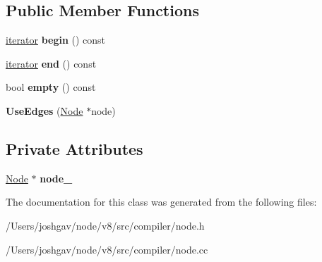 \subsection*{Public Member Functions}
\begin{DoxyCompactItemize}
\item 
\hyperlink{classv8_1_1internal_1_1compiler_1_1_node_1_1_use_edges_1_1iterator}{iterator} {\bfseries begin} () const \hypertarget{classv8_1_1internal_1_1compiler_1_1_node_1_1_use_edges_a84eaf8559ba0920a9608565ce1c51fbf}{}\label{classv8_1_1internal_1_1compiler_1_1_node_1_1_use_edges_a84eaf8559ba0920a9608565ce1c51fbf}

\item 
\hyperlink{classv8_1_1internal_1_1compiler_1_1_node_1_1_use_edges_1_1iterator}{iterator} {\bfseries end} () const \hypertarget{classv8_1_1internal_1_1compiler_1_1_node_1_1_use_edges_a632083fcc45db4788c950d20a27646e0}{}\label{classv8_1_1internal_1_1compiler_1_1_node_1_1_use_edges_a632083fcc45db4788c950d20a27646e0}

\item 
bool {\bfseries empty} () const \hypertarget{classv8_1_1internal_1_1compiler_1_1_node_1_1_use_edges_a4bc0752357f6d275ddfa8ab0ca5e55b1}{}\label{classv8_1_1internal_1_1compiler_1_1_node_1_1_use_edges_a4bc0752357f6d275ddfa8ab0ca5e55b1}

\item 
{\bfseries Use\+Edges} (\hyperlink{classv8_1_1internal_1_1compiler_1_1_node}{Node} $\ast$node)\hypertarget{classv8_1_1internal_1_1compiler_1_1_node_1_1_use_edges_a59105285a32885731589dc91fd1cec82}{}\label{classv8_1_1internal_1_1compiler_1_1_node_1_1_use_edges_a59105285a32885731589dc91fd1cec82}

\end{DoxyCompactItemize}
\subsection*{Private Attributes}
\begin{DoxyCompactItemize}
\item 
\hyperlink{classv8_1_1internal_1_1compiler_1_1_node}{Node} $\ast$ {\bfseries node\+\_\+}\hypertarget{classv8_1_1internal_1_1compiler_1_1_node_1_1_use_edges_af32f9f83e46cb0b56b31ed6673307b09}{}\label{classv8_1_1internal_1_1compiler_1_1_node_1_1_use_edges_af32f9f83e46cb0b56b31ed6673307b09}

\end{DoxyCompactItemize}


The documentation for this class was generated from the following files\+:\begin{DoxyCompactItemize}
\item 
/\+Users/joshgav/node/v8/src/compiler/node.\+h\item 
/\+Users/joshgav/node/v8/src/compiler/node.\+cc\end{DoxyCompactItemize}
